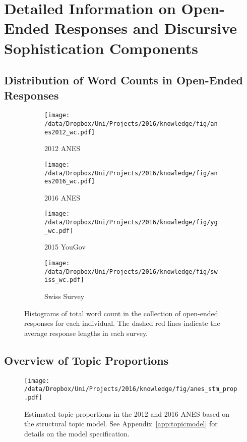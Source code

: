 \section[Information on Discursive Sophistication Components]{Detailed Information on Open-Ended Responses and Discursive Sophistication Components}\label{app:oeinfo}


\subsection{Distribution of Word Counts in Open-Ended Responses}

\begin{figure*}[h]
    \centering
    \begin{subfigure}[t]{0.49\textwidth}
        \centering
        \texttt{[image: /data/Dropbox/Uni/Projects/2016/knowledge/fig/anes2012\_wc.pdf]}
        \caption{2012 ANES}
    \end{subfigure}%
	\begin{subfigure}[t]{0.49\textwidth}
        \centering
        \texttt{[image: /data/Dropbox/Uni/Projects/2016/knowledge/fig/anes2016\_wc.pdf]}
        \caption{2016 ANES}
    \end{subfigure}%
    
    \begin{subfigure}[t]{0.49\textwidth}
        \centering
        \texttt{[image: /data/Dropbox/Uni/Projects/2016/knowledge/fig/yg\_wc.pdf]}
        \caption{2015 YouGov}
    \end{subfigure}
    \begin{subfigure}[t]{0.49\textwidth}
         \centering
         \texttt{[image: /data/Dropbox/Uni/Projects/2016/knowledge/fig/swiss\_wc.pdf]}
         \caption{Swiss Survey}
    \end{subfigure}
    \caption[Histograms of total word count in open-ended responses]{Histograms of total word count in the collection of open-ended responses for each individual. The dashed red lines indicate the average response lengths in each survey.}\label{fig:wc}
\end{figure*}


\clearpage
\subsection{Overview of Topic Proportions}

\begin{figure}[h]\centering
\texttt{[image: /data/Dropbox/Uni/Projects/2016/knowledge/fig/anes\_stm\_prop.pdf]}
\caption[Estimated topic proportions in the 2012 and 2016 ANES based on the structural topic model]{Estimated topic proportions in the 2012 and 2016 ANES based on the structural topic model. See Appendix~\ref{app:topicmodel} for details on the model specification.}\label{fig:anes_stm_prop}
\end{figure}

